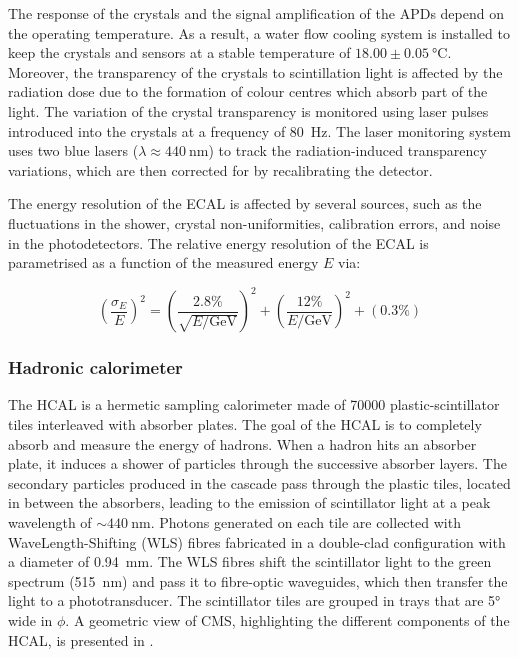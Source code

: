 The response of the crystals and the signal amplification of the APDs depend on the operating temperature. As a result, a water flow cooling system is installed to keep the crystals and sensors at a stable  temperature of $18.00\pm\SI{0.05}{\celsius}$. Moreover, the transparency of the crystals to scintillation light is affected by the radiation dose due to the formation of colour centres which absorb part of the light. The variation of the crystal transparency is monitored using laser pulses introduced into the crystals at a frequency of \SI{80}{\Hz}. The laser monitoring system uses two blue lasers ($\lambda\approx\SI{440}{\nm}$) to track the radiation-induced transparency variations, which are then corrected for by recalibrating the detector.

The energy resolution of the ECAL is affected by several sources, such as the fluctuations in the shower, crystal non-uniformities, calibration errors, and noise in the photodetectors. The relative energy resolution of the ECAL is parametrised as a function of the measured energy $E$ via:

\begin{equation}
  \left(\frac{\sigma_{E}}{E}\right)^{2} = \left(\frac{2.8\%}{\sqrt{E/\si{\GeV}}}\right)^{2} + \left(\frac{12\%}{E/\si{\GeV}}\right)^{2} + \left(0.3\%\right)
\end{equation}


\subsubsection{Hadronic calorimeter}\label{sec:Experiment_CMS_Subdetectors_HCAL}

The HCAL is a hermetic sampling calorimeter made of 70000 plastic-scintillator tiles interleaved with absorber plates. The goal of the HCAL is to completely absorb and measure the energy of hadrons. When a hadron hits an absorber plate, it induces a shower of particles through the successive absorber layers. The secondary particles produced in the cascade pass through the plastic tiles, located in between the absorbers, leading to the emission of scintillator light at a peak wavelength of $\sim\SI{440}{\nm}$. Photons generated on each tile are collected with WaveLength-Shifting (WLS) fibres fabricated in a double-clad configuration with a diameter of \SI{0.94}{\mm}. The WLS fibres shift the scintillator light to the green spectrum (\SI{515}{\nm}) and pass it to fibre-optic waveguides, which then transfer the light to a phototransducer. The scintillator tiles are grouped in trays that are \ang{5} wide in $\phi$. A geometric view of CMS, highlighting the different components of the HCAL, is presented in .

